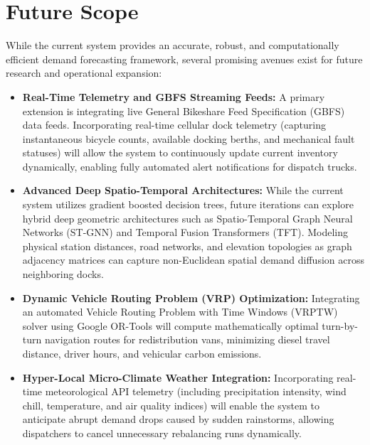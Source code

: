\documentclass[12pt, a4paper]{article}
\renewcommand{\_}{\textunderscore\allowbreak}
\begin{document}
\clearpage

\section{Future Scope}

While the current system provides an accurate, robust, and computationally efficient demand forecasting framework, several promising avenues exist for future research and operational expansion:

\begin{itemize}
    \item \textbf{Real-Time Telemetry and GBFS Streaming Feeds:} A primary extension is integrating live General Bikeshare Feed Specification (GBFS) data feeds. Incorporating real-time cellular dock telemetry (capturing instantaneous bicycle counts, available docking berths, and mechanical fault statuses) will allow the system to continuously update current inventory dynamically, enabling fully automated alert notifications for dispatch trucks.
    
    \item \textbf{Advanced Deep Spatio-Temporal Architectures:} While the current system utilizes gradient boosted decision trees, future iterations can explore hybrid deep geometric architectures such as Spatio-Temporal Graph Neural Networks (ST-GNN) and Temporal Fusion Transformers (TFT). Modeling physical station distances, road networks, and elevation topologies as graph adjacency matrices can capture non-Euclidean spatial demand diffusion across neighboring docks.
    
    \item \textbf{Dynamic Vehicle Routing Problem (VRP) Optimization:} Integrating an automated Vehicle Routing Problem with Time Windows (VRPTW) solver using Google OR-Tools will compute mathematically optimal turn-by-turn navigation routes for redistribution vans, minimizing diesel travel distance, driver hours, and vehicular carbon emissions.
    
    \item \textbf{Hyper-Local Micro-Climate Weather Integration:} Incorporating real-time meteorological API telemetry (including precipitation intensity, wind chill, temperature, and air quality indices) will enable the system to anticipate abrupt demand drops caused by sudden rainstorms, allowing dispatchers to cancel unnecessary rebalancing runs dynamically.
    

\end{itemize}
\end{document}
